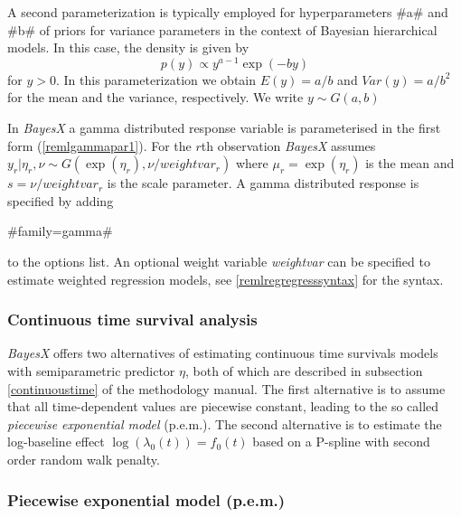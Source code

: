A second parameterization is typically employed for hyperparameters
#a# and #b# of priors for variance parameters in the context of
Bayesian hierarchical models. In this case, the density is given by
\begin{equation}
\label{remlgammapar2} p(y) \propto y^{a-1}\exp(-b y)
\end{equation}
for $y>0$. In this parameterization we obtain $E(y) = a/b$ and
$Var(y) = a/b^2$ for the mean and the variance, respectively. We
write $y \sim G(a,b)$

In {\em BayesX} a gamma distributed response variable is
parameterised in the first form (\ref{remlgammapar1}). For the $r$th
observation {\em BayesX} assumes  $y_r | \eta_r,\nu \sim
G(\exp(\eta_r),\nu/weightvar_r)$ where $\mu_r = \exp(\eta_r)$ is the
mean and $s=\nu/weightvar_r$ is the scale parameter. A gamma
distributed response is specified by adding

#family=gamma#

to the options list. An optional weight variable {\em weightvar} can
be specified to estimate weighted regression models, see
\autoref{remlregregresssyntax} for the syntax.

\subsubsection*{Continuous time survival analysis}

\textit{BayesX} offers two alternatives of estimating continuous
time survivals models with semiparametric predictor $\eta$, both of
which are described in subsection \ref*{continuoustime} of the
methodology manual. The first alternative is to assume that all
time-dependent values are piecewise constant, leading to the so
called \textit{piecewise exponential model} (p.e.m.). The second
alternative is to estimate the log-baseline effect
$\log(\lambda_0(t))=f_0(t)$ based on a P-spline with second order
random walk penalty.

\subsubsection*{Piecewise exponential model
(p.e.m.)}

